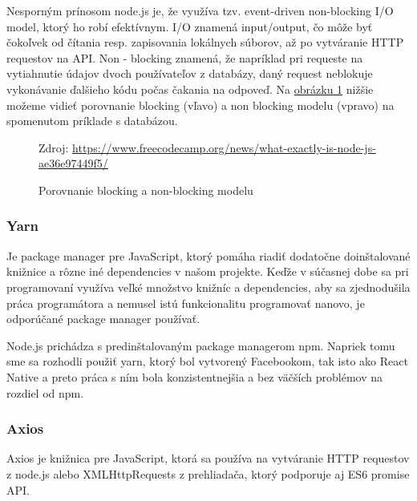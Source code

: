 Nesporným prínosom node.js je, že využíva tzv. event-driven non-blocking I/O model, ktorý ho robí efektívnym. I/O znamená input/output, čo môže byť čokoľvek od čítania resp. zapisovania lokálnych súborov, až po vytváranie HTTP requestov na API. Non - blocking znamená, že napríklad pri requeste na vytiahnutie údajov dvoch používateľov z databázy, daný request neblokuje vykonávanie ďalšieho kódu počas čakania na odpoveď. Na \hyperref[nodejsImg]{ obrázku \ref{nodejsImg}} nižšie možeme vidieť porovnanie blocking (vľavo) a non blocking modelu (vpravo) na spomenutom príklade s databázou. \\

\begin{figure}[!htbp]
  \centering  
  \def\stackalignment{c}
           {\scriptsize%
            Zdroj: \url{https://www.freecodecamp.org/news/what-exactly-is-node-js-ae36e97449f5/}}
	\caption{Porovnanie blocking a non-blocking modelu}  
  \label{nodejsImg}
\end{figure}

\subsubsection{Yarn}
Je package manager pre JavaScript, ktorý pomáha riadiť dodatočne doinštalované knižnice a rôzne iné dependencies v našom projekte. Keďže v súčasnej dobe sa pri programovaní využíva veľké množstvo knižníc a dependencies, aby sa zjednodušila práca programátora a nemusel istú funkcionalitu programovať nanovo, je odporúčané package manager používať. 

Node.js prichádza s predinštalovaným package managerom npm. Napriek tomu sme sa rozhodli použiť yarn, ktorý bol vytvorený Facebookom, tak isto ako React Native a preto práca s ním bola konzistentnejšia a bez väčších problémov na rozdiel od npm. \\
\subsubsection{Axios}
Axios je knižnica pre JavaScript, ktorá sa používa na vytváranie HTTP requestov z node.js alebo XMLHttpRequests z prehliadača, ktorý podporuje aj ES6 promise API. \\


